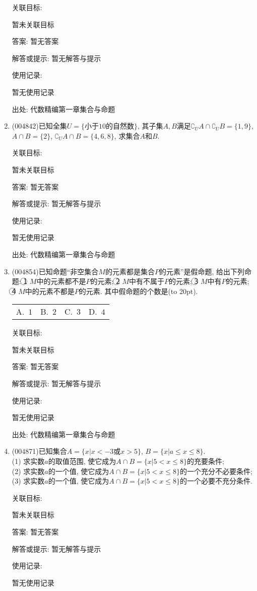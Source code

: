 \documentclass[10pt,a4paper]{article}
\newcommand{\bracket}[1]{(\hbox to #1pt{})}
\newcommand{\fourch}[4]{\par\begin{tabular}{p{.23\textwidth}p{.23\textwidth}p{.23\textwidth}p{.23\textwidth}}
A.~#1 &B.~#2& C.~#3& D.~#4
\end{tabular}}
\begin{document}
\begin{enumerate}[1.]
关联目标:

暂未关联目标

答案: 暂无答案

解答或提示: 暂无解答与提示

使用记录:

暂无使用记录


出处: 代数精编第一章集合与命题
\item { (004842)}已知全集$U=\{\text{小于}10\text{的自然数}\}$, 其子集$A,B$满足$\complement_UA\cap \complement_UB=\{1,9\}$, $A\cap B=\{2\}$, $\complement_UA\cap B=\{4,6,8\}$, 求集合$A$和$B$.


关联目标:

暂未关联目标

答案: 暂无答案

解答或提示: 暂无解答与提示

使用记录:

暂无使用记录


出处: 代数精编第一章集合与命题
\item { (004854)}已知命题``非空集合$M$的元素都是集合$P$的元素''是假命题, 给出下列命题: \textcircled{1} $M$中的元素都不是$P$的元素; \textcircled{2} $M$中有不属于$P$的元素; \textcircled{3} $M$中有$P$的元素; \textcircled{4} $M$中的元素不都是$P$的元素. 其中假命题的个数是\bracket{20}.
\fourch{$1$}{$2$}{$3$}{$4$}


关联目标:

暂未关联目标

答案: 暂无答案

解答或提示: 暂无解答与提示

使用记录:

暂无使用记录


出处: 代数精编第一章集合与命题
\item { (004871)}已知集合$A=\{x|x<-3\text{或}x>5\}$, $B=\{x|a\le x\le 8\}$.\\
(1) 求实数$a$的取值范围, 使它成为$A\cap B=\{x|5<x\le 8\}$的充要条件;\\
(2) 求实数$a$的一个值, 使它成为$A\cap B=\{x|5<x\le 8\}$的一个充分不必要条件;\\
(3) 求实数$a$的一个值, 使它成为$A\cap B=\{x|5<x\le 8\}$的一个必要不充分条件.


关联目标:

暂未关联目标

答案: 暂无答案

解答或提示: 暂无解答与提示

使用记录:

暂无使用记录



\end{enumerate}
\end{document}
